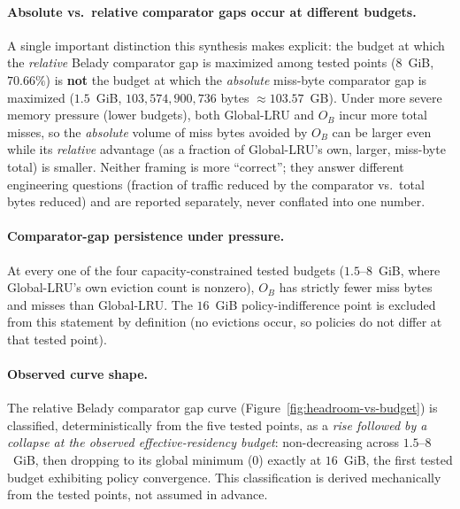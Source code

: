 

\paragraph{Absolute vs.\ relative comparator gaps occur at different
budgets.} A single important distinction this synthesis makes explicit:
the budget at which the \emph{relative} Belady comparator gap is maximized
among tested points ($8$~GiB, $70.66\%$) is \textbf{not} the budget at
which the \emph{absolute} miss-byte comparator gap is maximized
($1.5$~GiB, $103{,}574{,}900{,}736$ bytes $\approx 103.57$~GB). Under more
severe memory pressure (lower budgets), both Global-LRU and $O_B$ incur
more total misses, so the \emph{absolute} volume of miss bytes avoided by
$O_B$ can be larger even while its \emph{relative} advantage (as a
fraction of Global-LRU's own, larger, miss-byte total) is smaller. Neither
framing is more ``correct''; they answer different engineering questions
(fraction of traffic reduced by the comparator vs.\ total bytes reduced) and
are reported separately, never conflated into one number.

\paragraph{Comparator-gap persistence under pressure.} At every one of the
four capacity-constrained tested budgets ($1.5$--$8$~GiB, where
Global-LRU's own eviction count is nonzero), $O_B$ has strictly fewer miss
bytes and misses than Global-LRU. The $16$~GiB policy-indifference point is
excluded from this statement by definition (no evictions occur, so policies
do not differ at that tested point).

\paragraph{Observed curve shape.} The relative Belady comparator gap curve
(Figure~\ref{fig:headroom-vs-budget}) is classified, deterministically
from the five tested points, as a \emph{rise followed by a collapse at
the observed effective-residency budget}: non-decreasing across
$1.5$--$8$~GiB, then dropping to its global minimum ($0$) exactly at
$16$~GiB, the first tested budget exhibiting policy convergence. This
classification is derived mechanically from the tested points, not
assumed in advance.

